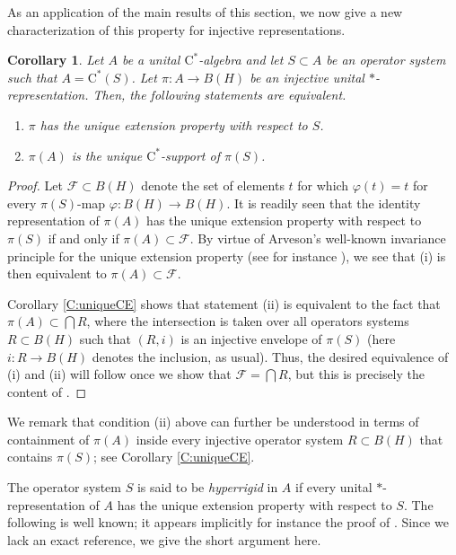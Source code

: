 \documentclass[10pt]{amsart}
\newcommand{\F}{{\mathcal{F}}}
\newcommand{\rC}{\mathrm{C}}
\renewcommand{\phi}{\varphi}
\newtheorem{corollary}[lemma]{Corollary}
\theoremstyle{definition}
\begin{document}
As an application of the main results of this section, we now give a new characterization of this property for injective representations.




\begin{corollary}\label{C:uep}
Let $A$ be a  unital $\rC^*$-algebra and let $S\subset A$ be an operator system such that $A=\rC^*(S)$. Let $\pi:A\to B(H)$ be an injective unital $*$-representation.  Then, the following statements are equivalent.
\begin{enumerate}[{\rm (i)}]
\item $\pi$ has the unique extension property with respect to $S$. 
\item $\pi(A)$ is the unique $\rC^*$-support of $\pi(S)$.
\end{enumerate}
\end{corollary}
\begin{proof}
Let $\F\subset B(H)$ denote the set of elements $t$ for which $\phi(t)=t$ for every $\pi(S)$-map $\phi:B(H)\to B(H)$. It is readily seen that the identity representation of $\pi(A)$ has the unique extension property with respect to $\pi(S)$ if and only if $\pi(A)\subset \F$. By virtue of Arveson's well-known invariance principle for the unique extension property (see for instance \cite[Theorem 2.1.2]{arveson1969}), we see that (i) is then equivalent to $\pi(A)\subset \F$.

Corollary \ref{C:uniqueCE} shows that statement (ii) is  equivalent to the fact that $\pi(A)\subset \bigcap R$, where the intersection is taken over all operators systems $R\subset B(H)$ such that $(R,i)$ is an injective envelope of $\pi(S)$ (here $i:R\to B(H)$ denotes the inclusion, as usual). Thus, the desired equivalence of (i) and (ii) will follow once we show that $\F=\bigcap R$, but this is precisely the content of  \cite[Proposition 4.3]{paulsen2011}.
\end{proof}

We remark that condition (ii) above can further be understood in terms of containment of $\pi(A)$ inside every injective operator system $R\subset B(H)$ that contains $\pi(S)$;  see Corollary \ref{C:uniqueCE}. 

The operator system $S$ is said to be \emph{hyperrigid} in $A$ if every unital $*$-representation of $A$ has the unique extension property with respect to $S$. The following is well known; it appears implicitly for instance the proof of \cite[Theorem 2.1]{arveson2011}. Since we lack an exact reference, we give the short argument here.
\end{document}

